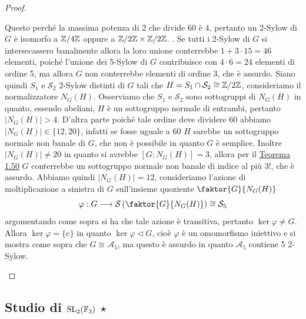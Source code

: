 \documentclass[11pt]{scrartcl}
\begin{document}
\begin{proof}
\begin{itemize}
{				Questo perché la massima potenza di 2 che divide 60 è 4, pertanto
				un 2-Sylow di $G$ è isomorfo a $\mathbb{Z}/{4}\mathbb{Z}$ oppure a $\mathbb{Z}/{2}\mathbb{Z}\times \mathbb{Z}/{2}\mathbb{Z}$.
			}. Se tutti i 2-Sylow di $G$ si intersecassero banalmente allora la 
			loro unione conterrebbe $1 + 3\cdot 15 = 46$ elementi, poiché l'unione dei
			5-Sylow di $G$ contribuisce con $4\cdot 6 = 24$ elementi di ordine 5,
			ma allora $G$ non conterrebbe elementi di ordine 3, che è assurdo.
			Siano quindi $S_1$ e $\mathcal{S}_2$ 2-Sylow distinti di $G$ tali che 
			$H = S_1\cap \mathcal{S}_2 \cong \mathbb{Z}/{2}\mathbb{Z}$, consideriamo il normalizzatore $N_G(H)$.
			Osserviamo che $S_1$ e $\mathcal{S}_2$ sono sottogruppi di $N_G(H)$ in quanto, essendo
			abeliani, $H$ è un sottogruppo normale di entrambi, pertanto $|N_G(H)| > 4$.
			D'altra parte poiché tale ordine deve dividere 60 abbiamo 
			$|N_G(H)| \in \{12, 20\}$, infatti se fosse uguale a 60 $H$ sarebbe un 
			sottogruppo normale non banale di $G$, che non è possibile in quanto $G$
			è semplice. Inoltre $|N_G(H)| \neq 20$ in quanto si avrebbe $[G:N_G(H)] = 3$,
			allora per il \hyperref[teorema1.50]{Teorema 1.50} $G$ conterrebbe
			un sottogruppo normale non banale di indice al più $3!$, che è assurdo.
			Abbiamo quindi $|N_G(H)| = 12$, consideriamo l'azione di 
			moltiplicazione a sinistra di $G$ sull'insieme quoziente $\faktor{G}{N_G(H)}$
			\[
			\varphi : G\longrightarrow\mathcal{S}\left(\faktor{G}{N_G(H)}\right)\cong \mathcal{S}_5
			\]
			argomentando come sopra si ha che tale azione è transitiva, pertanto
			$\ker\varphi \neq G$. Allora $\ker\varphi = \{e\}$ in quanto 
			$\ker\varphi\triangleleft G$, cioè $\varphi$ è un omomorfismo iniettivo
			e si mostra come sopra che $G \cong \mathcal{A}_5$, ma questo è assurdo 
			in quanto $\mathcal{A}_5$ contiene 5 2-Sylow.
		\end{itemize}
	\end{proof}
	
	\newpage
	
	\subsection{Studio di \texorpdfstring{$\operatorname{SL}_2(\mathbb F_3)$ $\star$}{SL₂(F₃) ★}}
	
\end{document}
